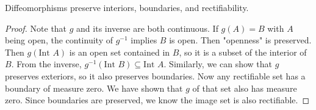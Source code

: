 \documentclass[12pt]{article}
\begin{document}
\begin{lemma}
    Diffeomorphisms preserve interiors, boundaries, and rectifiability.
\end{lemma}

\begin{proof}
    Note that $g$ and its inverse are both continuous. If $g(A) = B$ with $A$ being open, the continuity of $g^{-1}$ implies $B$ is open. Then "openness" is preserved. Then $g(\text{Int }A)$ is an open set contained in $B$, so it is a subset of the interior of $B$. From the inverse, $g^{-1}(\text{Int }B) \subseteq \text{Int }A$. Similarly, we can show that $g$ preserves exteriors, so it also preserves boundaries. Now any rectifiable set has a boundary of measure zero. We have shown that $g$ of that set also has measure zero. Since boundaries are preserved, we know the image set is also rectifiable.
\end{proof}
\end{document}
